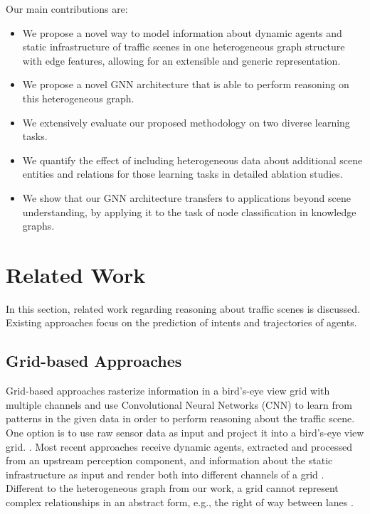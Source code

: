 \documentclass[letterpaper, 10 pt, journal, twoside]{IEEEtran}
\begin{document}
Our main contributions are:
\begin{itemize}
	\item We propose a novel way to model information about dynamic agents and static infrastructure of traffic scenes in one heterogeneous graph structure with edge features, allowing for an extensible and generic representation.
	\item We propose a novel GNN architecture that is able to perform reasoning on this heterogeneous graph.
	\item We extensively evaluate our proposed methodology on two diverse learning tasks.
	\item We quantify the effect of including heterogeneous data about additional scene entities and relations for those learning tasks in detailed ablation studies.
	\item We show that our GNN architecture transfers to applications beyond scene understanding, by applying it to the task of node classification in knowledge graphs.
\end{itemize}


\section{Related Work}
In this section, related work regarding reasoning about traffic scenes is discussed.
Existing approaches focus on the prediction of intents and trajectories of agents.

\subsection{Grid-based Approaches}
Grid-based approaches rasterize information in a bird's-eye view grid with multiple channels and use Convolutional Neural Networks (CNN) to learn from patterns in the given data in order to perform reasoning about the traffic scene.
One option is to use raw sensor data as input and project it into a bird's-eye view grid. \cite{Casas2018}.
Most recent approaches receive dynamic agents, extracted and processed from an upstream perception component, and information about the static infrastructure as input and render both into different channels of a grid \cite{Hong2019, Bansal2019, Chai2020, Djuric2020}.
Different to the heterogeneous graph from our work, a grid cannot represent complex relationships in an abstract form, e.g., the right of way between lanes \cite{Liang2020, Zeng2021}.
\end{document}
